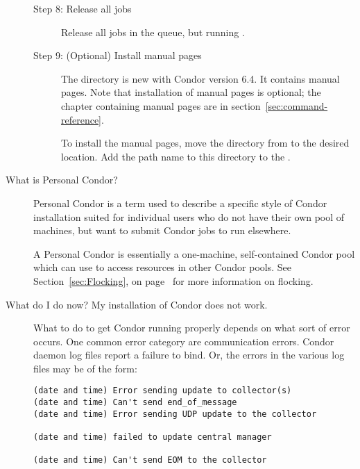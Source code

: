 \begin{description}
\begin{description}
\item[Step 8:  Release all jobs]
Release all jobs in the queue, but running .

\item[Step 9:  (Optional) Install manual pages]

The  directory is new with Condor version 6.4.
It contains manual pages.
Note that installation of manual pages is optional;
the chapter containing manual pages are in
section~\ref{sec:command-reference}.

To install the manual pages, move the  directory
from  to the desired location.
Add the path name to this directory to the
.

\end{description}

%

\item[What is Personal Condor?]

Personal Condor is a term used to describe a specific style of Condor
installation suited for individual users who do not have their own
pool of machines, but want to submit Condor jobs to run elsewhere.

A Personal Condor is essentially a one-machine, self-contained Condor
pool which can use  to access resources in other Condor
pools.
See Section~\ref{sec:Flocking}, on page~\pageref{sec:Flocking} for
more information on flocking.


\item[What do I do now? My installation of Condor does not work.]

What to do to get Condor running properly depends on what sort of
error occurs. 
One common error category are communication errors.
Condor daemon log files report a failure to bind.
Or, the errors in the various log files may be of the form:

\begin{verbatim}
(date and time) Error sending update to collector(s)
(date and time) Can't send end_of_message
(date and time) Error sending UDP update to the collector

(date and time) failed to update central manager

(date and time) Can't send EOM to the collector
\end{verbatim}


\end{description}
